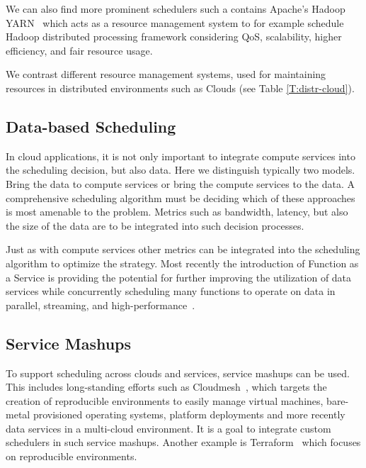 \documentclass[final,5p,times,twocolumn]{elsarticle}
\begin{document}
We can also find more prominent schedulers such a contains Apache's Hadoop YARN~\cite{vavilapalli2013apache} which acts as a resource management system to for example schedule Hadoop distributed processing framework considering QoS, scalability, higher efficiency, and fair resource usage.

We contrast different resource management systems, used for maintaining resources in distributed environments such as Clouds (see Table \ref{T:distr-cloud}).

%

\subsection{Data-based Scheduling}

In cloud applications, it is not only important to integrate compute services into the scheduling decision, but also data. Here we distinguish typically two models. Bring the data to compute services or bring the compute services to the data. A comprehensive scheduling algorithm must be deciding which of these approaches is most amenable to the problem. Metrics such as bandwidth, latency, but also the size of the data are to be integrated into such decision processes. 

Just as with compute services other metrics can be integrated into the scheduling algorithm to optimize the strategy. Most recently the introduction of Function as a Service is providing the potential for further improving the utilization of data services while concurrently scheduling many functions to operate on data in parallel, streaming, and high-performance~\cite{twister2}. 


\subsection{Service Mashups} 
\label{sec:mesh}

To support scheduling across clouds and services, service mashups can be used. This includes long-standing efforts such as Cloudmesh~\cite{von2014accessing}, which targets the creation of reproducible environments to easily manage virtual machines, bare-metal provisioned operating systems, platform deployments and more recently data services in a multi-cloud environment. It is a goal to integrate custom schedulers in such service mashups. Another example is Terraform~\cite{www-terraform} which focuses on reproducible environments.
\end{document}
